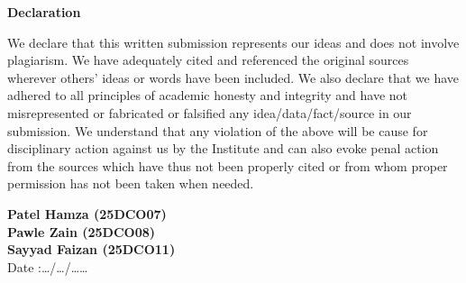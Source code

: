\begin{center}
\thispagestyle{empty}
\LARGE{\textbf{Declaration}}\\[1.5cm]
\end{center}

We declare that this written submission represents our ideas and does not involve plagiarism. We have adequately cited and referenced the original sources wherever others' ideas or words have been included. We also declare that we have adhered to all principles of academic honesty and integrity and have not misrepresented or fabricated or falsified any idea/data/fact/source in our submission. We understand that any violation of the above will be cause for disciplinary action against us by the Institute and can also evoke penal action from the sources which have thus not been properly cited or from whom proper permission has not been taken when needed. 

\vspace{2cm}
\noindent
\large{\textbf{Patel Hamza (25DCO07)}} \\[0.6cm]
\large{\textbf{Pawle Zain (25DCO08)}} \\[0.6cm]
\large{\textbf{Sayyad Faizan (25DCO11)}} \\

\vspace{4.5cm}
Date :\hspace{0.2cm}\ldots/\ldots/\ldots\ldots
